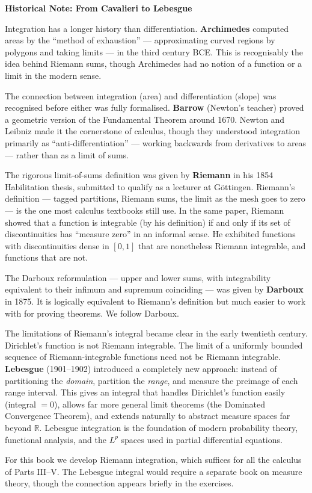 \documentclass[12pt, openany]{book}
\theoremstyle{plain}
\theoremstyle{definition}
\theoremstyle{remark}
\newcommand{\R}{\mathbb{R}}
\begin{document}
\begin{remarkbox}
\textbf{Historical Note: From Cavalieri to Lebesgue}

Integration has a longer history than differentiation. \textbf{Archimedes} computed areas by the ``method of exhaustion'' --- approximating curved regions by polygons and taking limits --- in the third century BCE. This is recognisably the idea behind Riemann sums, though Archimedes had no notion of a function or a limit in the modern sense.

The connection between integration (area) and differentiation (slope) was recognised before either was fully formalised. \textbf{Barrow} (Newton's teacher) proved a geometric version of the Fundamental Theorem around 1670. Newton and Leibniz made it the cornerstone of calculus, though they understood integration primarily as ``anti-differentiation'' --- working backwards from derivatives to areas --- rather than as a limit of sums.

The rigorous limit-of-sums definition was given by \textbf{Riemann} in his 1854 Habilitation thesis, submitted to qualify as a lecturer at G\"{o}ttingen. Riemann's definition --- tagged partitions, Riemann sums, the limit as the mesh goes to zero --- is the one most calculus textbooks still use. In the same paper, Riemann showed that a function is integrable (by his definition) if and only if its set of discontinuities has ``measure zero'' in an informal sense. He exhibited functions with discontinuities dense in $[0,1]$ that are nonetheless Riemann integrable, and functions that are not.

The Darboux reformulation --- upper and lower sums, with integrability equivalent to their infimum and supremum coinciding --- was given by \textbf{Darboux} in 1875. It is logically equivalent to Riemann's definition but much easier to work with for proving theorems. We follow Darboux.

The limitations of Riemann's integral became clear in the early twentieth century. Dirichlet's function is not Riemann integrable. The limit of a uniformly bounded sequence of Riemann-integrable functions need not be Riemann integrable. \textbf{Lebesgue} (1901--1902) introduced a completely new approach: instead of partitioning the \emph{domain}, partition the \emph{range}, and measure the preimage of each range interval. This gives an integral that handles Dirichlet's function easily (integral $= 0$), allows far more general limit theorems (the Dominated Convergence Theorem), and extends naturally to abstract measure spaces far beyond $\R$. Lebesgue integration is the foundation of modern probability theory, functional analysis, and the $L^p$ spaces used in partial differential equations.

For this book we develop Riemann integration, which suffices for all the calculus of Parts III--V. The Lebesgue integral would require a separate book on measure theory, though the connection appears briefly in the exercises.
\end{remarkbox}
\color{black}
\end{document}
